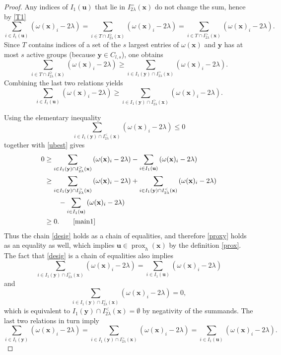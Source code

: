\documentclass[11pt,a4paper]{article}
\newcommand{\eqjust}[1]{\qquad\eqref{#1}}
\theoremstyle{plain}
\theoremstyle{definition}
\theoremstyle{remark}
\newcommand*\x{\mathbf{x}}
\newcommand*\U{\mathbf{u}}
\newcommand*\y{\mathbf{y}}
\newcommand*\prox{\operatorname{prox}}
\begin{document}
\begin{proof}
  Any indices of \(I_1(\U)\) that lie in \(I_{2\lambda}^=(\x)\) do not change the sum, hence by \eqref{T1} $$ \sum_{i \in I_1(\U)}\left(\omega(\x)_i-2 \lambda\right)=\sum_{i \in T \cap I_{2\lambda}^\geq(\x)}\left(\omega(\x)_i-2 \lambda\right)=\sum_{i \in T \cap I_{2\lambda}^>(\x)}\left(\omega(\x)_i-2 \lambda\right) .
  $$
  Since \(T\) contains indices of a set of the \(s\) largest entries of
  \(\omega(\x)\) and \(\y\) has at most \(s\) active groups (because
  \(\y \in C_{l,s}\)), one obtains
  $$
    \sum_{i \in T \cap I_{2\lambda}^\geq(\x)}\left(\omega(\x)_i-2 \lambda\right) \geq \sum_{i \in I_1(\y) \cap I_{2\lambda}^>(\x)}\left(\omega(\x)_i-2 \lambda\right) .
  $$
  Combining the last two relations yields
  \begin{equation}
    \label{ubest}
    \sum_{i \in I_1(\U)}\left(\omega(\x)_i-2 \lambda\right) \geq \sum_{i \in I_1(\y) \cap I_{2\lambda}^>(\x)}\left(\omega(\x)_i-2 \lambda\right) .
  \end{equation}

  Using the elementary inequality
  \begin{equation}
    \label{negat}
    \sum_{i \in I_1(\y) \cap I^<_{2\lambda}(\x)}\left(\omega(\x)_i-2 \lambda\right) \leq 0
  \end{equation}
  together with \eqref{ubest} gives
  \begin{equation}
    \label{desig}
    \begin{aligned}
      0 & \geq \sum_{i \in I_1(\y) \cap I_{2\lambda}^>(\x)}\left(\omega(\x)_i-2 \lambda\right)-\sum_{i \in I_1(\U)}\left(\omega(\x)_i-2 \lambda\right)                         \\
        & \geq \sum_{i \in I_1(\y) \cap I_{2\lambda}^>(\x)}\left(\omega(\x)_i-2 \lambda\right)+\sum_{i \in I_1(\y) \cap I^<_{2\lambda}(\x)}\left(\omega(\x)_i-2 \lambda\right) \\
        & \qquad-\sum_{i \in I_1(\U)}\left(\omega(\x)_i-2 \lambda\right)                                                                                                       \\
        & \geq 0. \eqjust{main1}
    \end{aligned}
  \end{equation}
  Thus the chain \eqref{desig} holds as a chain of equalities, and therefore \eqref{proxy} holds as an equality as well, which implies \(\U \in \prox_h(\x)\) by the definition \eqref{prox}.
  The fact that \eqref{desig} is a chain of equalities also implies $$ \sum_{i \in I_1(\y) \cap I_{2\lambda}^>(\x)}\left(\omega(\x)_i-2 \lambda\right)=\sum_{i \in I_1(\U)}\left(\omega(\x)_i-2 \lambda\right) $$ and $$ \sum_{i \in I_1(\y) \cap I^<_{2\lambda}(\x)}\left(\omega(\x)_i-2 \lambda\right)=0, $$ which is equivalent to \(I_1(\y) \cap I^<_{2\lambda}(\x)=\emptyset\) by negativity of the summands.
  The last two relations in turn imply $$ \sum_{i \in I_1(\y)}\left(\omega(\x)_i-2 \lambda\right)=\sum_{i \in I_1(\y) \cap I_{2\lambda}^>(\x)}\left(\omega(\x)_i-2 \lambda\right)=\sum_{i \in I_1(\U)}\left(\omega(\x)_i-2 \lambda\right) .
  $$


\end{proof}
\end{document}
